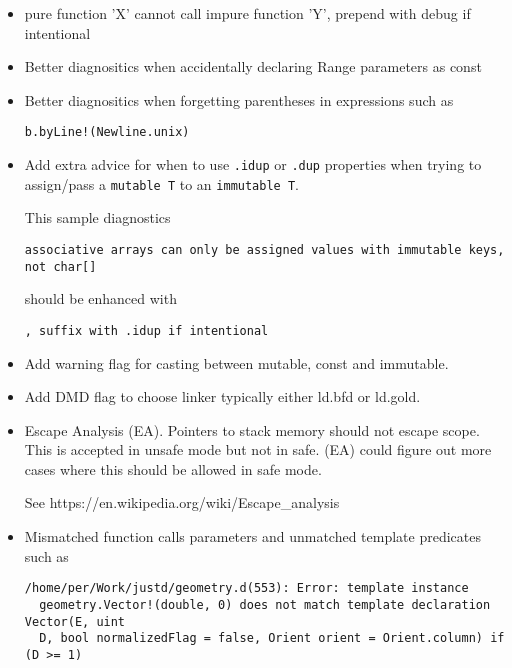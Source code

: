 \documentclass[xcolor=dvipsnames, twocolumn]{article}
\begin{document}
\begin{itemize}

\item pure function 'X' cannot call impure function 'Y', prepend with debug if intentional

\item Better diagnositics when accidentally declaring Range parameters as const

\item Better diagnositics when forgetting parentheses in expressions such as

\begin{lstlisting}[frame=single]
b.byLine!(Newline.unix)
\end{lstlisting}

\item Add extra advice for when to use \texttt{.idup} or \texttt{.dup}
  properties when trying to assign/pass a \texttt{mutable T} to an
  \texttt{immutable T}.

This sample diagnostics

\begin{lstlisting}[frame=single]
associative arrays can only be assigned values with immutable keys, not char[]
\end{lstlisting}

should be enhanced with

\begin{lstlisting}[frame=single]
, suffix with .idup if intentional
\end{lstlisting}

\item Add warning flag for casting between mutable, const and immutable.

\item Add DMD flag to choose linker typically either ld.bfd or ld.gold.

\item Escape Analysis (EA). Pointers to stack memory should not escape scope. This is
  accepted in unsafe mode but not in safe. (EA) could figure out more
  cases where this should be allowed in safe mode.

See https://en.wikipedia.org/wiki/Escape_analysis

\item Mismatched function calls parameters and unmatched template predicates such as

\begin{lstlisting}[frame=single]
/home/per/Work/justd/geometry.d(553): Error: template instance
  geometry.Vector!(double, 0) does not match template declaration Vector(E, uint
  D, bool normalizedFlag = false, Orient orient = Orient.column) if (D >= 1)
\end{lstlisting}


\end{itemize}
\end{document}
